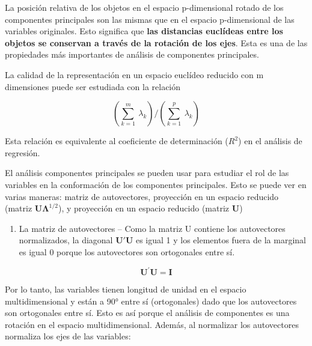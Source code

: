 \documentclass[]{book}
\providecommand{\tightlist}{%
  \setlength{\itemsep}{0pt}\setlength{\parskip}{0pt}}
\theoremstyle{definition}
\theoremstyle{definition}
\theoremstyle{definition}
\theoremstyle{remark}
\begin{document}
La posición relativa de los objetos en el espacio p-dimensional rotado
de los componentes principales son las mismas que en el espacio
p-dimensional de las variables originales. Esto significa que
\textbf{las distancias euclídeas entre los objetos se conservan a través
de la rotación de los ejes}. Esta es una de las propiedades más
importantes de análisis de componentes principales.

La calidad de la representación en un espacio euclídeo reducido con m
dimensiones puede ser estudiada con la relación

\[
\left( \sum_{k = 1}^{m}{\ \lambda_{k}} \right)/\left( \sum_{k = 1}^{p}{\ \lambda_{k}} \right)
\]

Esta relación es equivalente al coeficiente de determinación (\(R^{2}\))
en el análisis de regresión.

El análisis componentes principales se pueden usar para estudiar el rol
de las variables en la conformación de los componentes principales. Esto
se puede ver en varias maneras: matriz de autovectores, proyección en un
espacio reducido (matriz \(\mathbf{U}\mathbf{\Lambda}^{1/2}\)), y
proyección en un espacio reducido (matriz \textbf{U})

\begin{enumerate}
\def\labelenumi{\arabic{enumi}.}
\tightlist
\item
  La matriz de autovectores -- Como la matriz U contiene los
  autovectores normalizados, la diagonal \(\mathbf{U}'\mathbf{U}\) es
  igual 1 y los elementos fuera de la marginal es igual 0 porque los
  autovectores son ortogonales entre sí.
\end{enumerate}

\[
\mathbf{U}^{'}\mathbf{U} = \mathbf{I}
\]

Por lo tanto, las variables tienen longitud de unidad en el espacio
multidimensional y están a 90° entre sí (ortogonales) dado que los
autovectores son ortogonales entre sí. Esto es así porque el análisis de
componentes es una rotación en el espacio multidimensional. Además, al
normalizar los autovectores normaliza los ejes de las variables:
\end{document}
